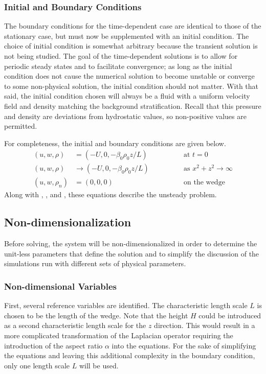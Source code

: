 \documentclass[12pt]{article}
\begin{document}
\subsubsection{Initial and Boundary Conditions}

The boundary conditions for the time-dependent case are identical to those of the stationary case, but must now be supplemented with an initial condition. The choice of initial condition is somewhat arbitrary because the transient solution is not being studied. The goal of the time-dependent solutions is to allow for periodic steady states and to facilitate convergence; as long as the initial condition does not cause the numerical solution to become unstable or converge to some non-physical solution, the initial condition should not matter. With that said, the initial condition chosen will always be a fluid with a uniform velocity field and density matching the background stratification.  Recall that this pressure and density are deviations from hydrostatic values, so non-positive values are permitted.

For completeness, the initial and boundary conditions are given below.
\begin{align}
\label{eq:IC}
(u,w,\rho)&=(-U,0,-\beta_0\rho_0z/L)\qquad\qquad&\text{at } t=0\\
\label{eq:farfieldbcunsteady}
(u,w,\rho)&\rightarrow(-U,0,-\beta_0\rho_0z/L)\qquad\qquad&\text{as } x^2+z^2\rightarrow\infty\\
\label{eq:wedgebcunseady}
(u,w, \rho_n)&=(0,0,0)&\text{on the wedge}
\end{align}
Along with , , and , these equations describe the unsteady problem.


\subsection{Non-dimensionalization}

Before solving, the system will be non-dimensionalized in order to determine the unit-less parameters that define the solution and to simplify the discussion of the simulations run with different sets of physical parameters.
 
\subsubsection{Non-dimensional Variables}

First, several reference variables are identified. The characteristic length scale $L$ is chosen to be the length of the wedge. Note that the height $H$ could be introduced as a second characteristic length scale for the $z$ direction. This would result in a more complicated transformation of the Laplacian operator requiring the introduction of the aspect ratio $\alpha$ into the equations. For the sake of simplifying the equations and leaving this additional complexity in the boundary condition, only one length scale $L$ will be used.
\end{document}
